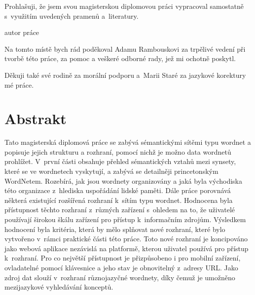 \documentclass[a4paper,11pt,openany,twoside]{book}
\begin{document}
	\cleardoublepage

\par
\par\vspace*{\fill}
	\pagestyle{plain}
\begin{flushright}
	Prohlašuji, že jsem svou magisterskou diplomovou práci vypracoval samostatně s~využitím uvedených pramenů a~literatury.

	\vspace{3em}

	    \makebox[2.5in][r]{\dotfill}
	    
	    autor práce

	    \par

\end{flushright}
\clearpage

\par
\par\vspace*{\fill}

Na tomto místě bych rád poděkoval Adamu Rambouskovi za trpělivé vedení při tvorbě této práce, za pomoc a veškeré odborné rady, jež mi ochotně poskytl.

Děkuji také své rodině za morální podporu a~Marii Staré za jazykové korektury mé práce.
\clearpage

\section*{Abstrakt}

Tato magisterská diplomová práce se zabývá sémantickými sítěmi typu wordnet a popisuje jejich strukturu a rozhraní, pomocí nichž je možno data wordnetů prohlížet. V~první části obsahuje přehled sémantických vztahů mezi synsety, které se ve wordnetech vyskytují, a zabývá se detailněji princetonským WordNetem. Rozebírá, jak jsou wordnety organizovány a jaká byla východiska této organizace z~hlediska uspořádání lidské paměti. Dále práce porovnává některá existující rozšířená rozhraní k~sítím typu wordnet. Hodnocena byla přístupnost těchto rozhraní z~různých zařízení s~ohledem na to, že uživatelé používají širokou škálu zařízení pro přístup k~informačním zdrojům. Výsledkem hodnocení byla kritéria, která by mělo splňovat nové rozhraní, které bylo vytvořeno v~rámci praktické části této práce. Toto nové rozhraní je koncipováno jako webová aplikace nezávislá na platformě, kterou uživatel používá pro přístup k~rozhraní. Pro co největší přístupnost je přizpůsobeno i pro mobilní zařízení, ovladatelné pomocí klávesnice a jeho stav je obnovitelný z~adresy URL. Jako zdroj dat slouží v~rozhraní různojazyčné wordnety, díky čemuž je umožněno mezijazykové vyhledávání konceptů.
\end{document}
